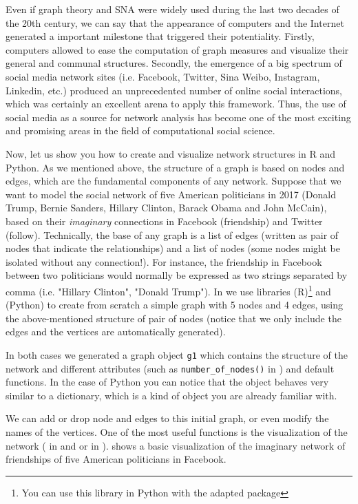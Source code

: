 Even if graph theory and SNA were widely used during the last two decades of the 20th century, we can say that the appearance of computers and the Internet generated a important milestone that triggered their potentiality. Firstly, computers allowed to ease the computation of graph measures and visualize their general and communal structures. Secondly, the emergence of a big spectrum of social media network sites (i.e. Facebook, Twitter, Sina Weibo, Instagram, Linkedin, etc.) produced an unprecedented number of online social interactions, which was certainly an excellent arena to apply this framework. Thus, the use of social media as a source for network analysis has become one of the most exciting and promising areas in the field of computational social science.

Now, let us show you how to create and visualize network structures in R and Python. As we mentioned above, the structure of a graph is based on nodes and edges, which are the fundamental components of any network. Suppose that we want to model the social network of five American politicians in 2017 (Donald Trump, Bernie Sanders, Hillary Clinton, Barack Obama and John McCain), based on their \textit{imaginary} connections in Facebook (friendship) and Twitter (follow). Technically, the base of any graph is a list of edges (written as pair of nodes that indicate the relationships) and a list of nodes (some nodes might be isolated without any connection!).  For instance, the friendship in Facebook between two politicians would normally be expressed as two strings separated by comma (i.e. "Hillary Clinton", "Donald Trump"). In  we use libraries  (R)\footnote{You can use this library in Python with the adapted package } and  (Python) to create from scratch a simple graph with 5 nodes and 4 edges, using the above-mentioned structure of pair of nodes (notice that we only include the edges and the vertices are automatically generated).


In both cases we generated a graph object \texttt{g1} which contains the structure of the network and different attributes (such as \verb|number_of_nodes()| in 	) and default functions. In the case of Python you can notice that the  object behaves very similar to a dictionary, which is a kind of object you are already familiar with.

We can add or drop node and edges to this initial graph, or even modify the names of the vertices. One of the most useful functions is the visualization of the network ( in  and  or  in ).  shows a basic visualization of the imaginary network of friendships of five American politicians in Facebook.

